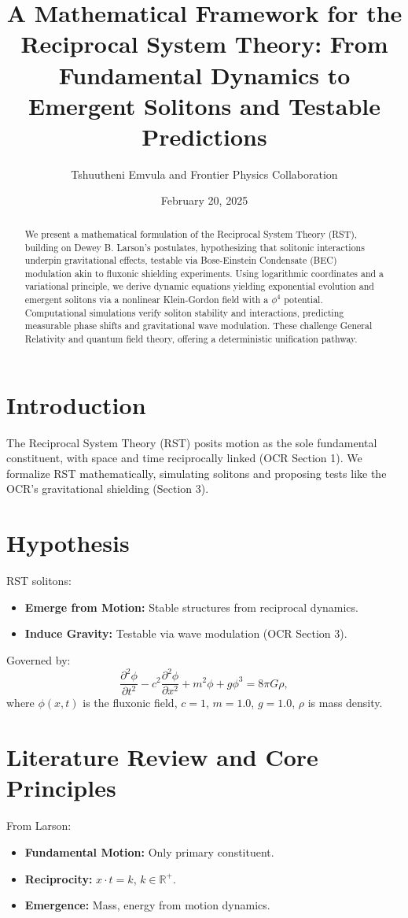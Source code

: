 \documentclass{article}
\title{A Mathematical Framework for the Reciprocal System Theory: From Fundamental Dynamics to Emergent Solitons and Testable Predictions}
\author{Tshuutheni Emvula and Frontier Physics Collaboration}
\date{February 20, 2025}
\begin{document}
\maketitle

\begin{abstract}
We present a mathematical formulation of the Reciprocal System Theory (RST), building on Dewey B. Larson’s postulates, hypothesizing that solitonic interactions underpin gravitational effects, testable via Bose-Einstein Condensate (BEC) modulation akin to fluxonic shielding experiments. Using logarithmic coordinates and a variational principle, we derive dynamic equations yielding exponential evolution and emergent solitons via a nonlinear Klein-Gordon field with a \(\phi^4\) potential. Computational simulations verify soliton stability and interactions, predicting measurable phase shifts and gravitational wave modulation. These challenge General Relativity and quantum field theory, offering a deterministic unification pathway.
\end{abstract}

\tableofcontents

\section{Introduction}
The Reciprocal System Theory (RST) posits motion as the sole fundamental constituent, with space and time reciprocally linked (OCR Section 1). We formalize RST mathematically, simulating solitons and proposing tests like the OCR’s gravitational shielding (Section 3).

\section{Hypothesis}
RST solitons:
\begin{itemize}
    \item \textbf{Emerge from Motion:} Stable structures from reciprocal dynamics.
    \item \textbf{Induce Gravity:} Testable via wave modulation (OCR Section 3).
\end{itemize}
Governed by:
\begin{equation}
\frac{\partial^2 \phi}{\partial t^2} - c^2 \frac{\partial^2 \phi}{\partial x^2} + m^2 \phi + g \phi^3 = 8 \pi G \rho,
\end{equation}
where \(\phi(x,t)\) is the fluxonic field, \(c = 1\), \(m = 1.0\), \(g = 1.0\), \(\rho\) is mass density.

\section{Literature Review and Core Principles}
From Larson:
\begin{itemize}
    \item \textbf{Fundamental Motion:} Only primary constituent.
    \item \textbf{Reciprocity:} \(x \cdot t = k\), \(k \in \mathbb{R}^+\).
    \item \textbf{Emergence:} Mass, energy from motion dynamics.
\end{itemize}
\end{document}
